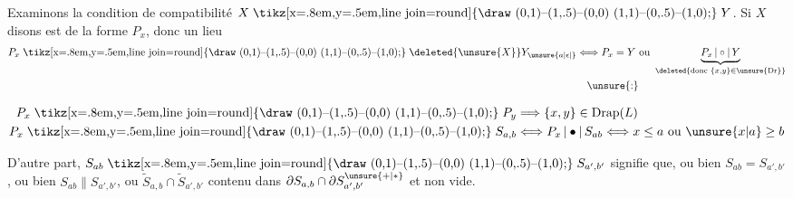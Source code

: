 Examinons la condition de compatibilité $X \mathrel{\vcenter{\hbox{\tikz[x=.8em,y=.5em,line join=round]{\draw (0,1)--(1,.5)--(0,0) (1,1)--(0,.5)--(1,0);}}}} Y$. Si $X$ disons  est de la forme $P_x$, donc un lieu
\[
 \begin{aligned}
 P_x \mathrel{\vcenter{\hbox{\tikz[x=.8em,y=.5em,line join=round]{\draw (0,1)--(1,.5)--(0,0) (1,1)--(0,.5)--(1,0);}}}} \deleted{\unsure{X}}Y_{\unsure{a|\epsilon|{}}}
   &\Longleftrightarrow P_x=Y\ \text{ou}\ 
      \underbrace{P_x\,|\circ|\,Y}_{\deleted{\text{donc }\{x,y\}\in\unsure{\mathrm{Dr}}}}\\
   &\hspace{1em}\unsure{:}
 \end{aligned}
\]

\[
\begin{aligned}
 P_x \mathrel{\vcenter{\hbox{\tikz[x=.8em,y=.5em,line join=round]{\draw (0,1)--(1,.5)--(0,0) (1,1)--(0,.5)--(1,0);}}}} P_y&\Longrightarrow\{x,y\}\in \mathrm{Drap}(L)\\
 P_x \mathrel{\vcenter{\hbox{\tikz[x=.8em,y=.5em,line join=round]{\draw (0,1)--(1,.5)--(0,0) (1,1)--(0,.5)--(1,0);}}}} S_{a,b}&\Longleftrightarrow P_x\,|\bullet|\,S_{ab}
              \Longleftrightarrow x\leq a\ \text{ou}\ \unsure{x|a}\geq b
\end{aligned}
\]

D'autre part, $S_{ab} \mathrel{\vcenter{\hbox{\tikz[x=.8em,y=.5em,line join=round]{\draw (0,1)--(1,.5)--(0,0) (1,1)--(0,.5)--(1,0);}}}} S_{a',b'}$ signifie que, ou bien $S_{ab}=S_{a',b'}$, ou bien $S_{ab}\parallel S_{a',b'}$, ou  $\widetilde S_{a,b}\cap\widetilde S_{a',b'}$ contenu dans $\partial S_{a,b}\cap\partial S_{a',b'}^{\unsure{+|*}}$ et non vide. 

